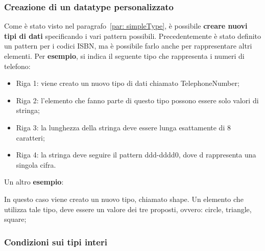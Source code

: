\documentclass[a4paper]{article}
\begin{document}
	\subsubsection{Creazione di un datatype personalizzato}
	
	Come è stato visto nel paragrafo~\ref{par: simpleType}, è possibile \textbf{creare nuovi tipi di dati} specificando i vari pattern possibili. Precedentemente è stato definito un pattern per i codici ISBN, ma è possibile farlo anche per rappresentare altri elementi. Per \textcolor{Green4}{\textbf{esempio}}, si indica il seguente tipo che rappresenta i numeri di telefono:
	
	\begin{itemize}
		\item Riga 1: viene creato un nuovo tipo di dati chiamato \textsf{TelephoneNumber};
		
		\item Riga 2: l'elemento che fanno parte di questo tipo possono essere solo valori di stringa;
		
		\item Riga 3: la lunghezza della stringa deve essere lunga esattamente di 8 caratteri;
		
		\item Riga 4: la stringa deve seguire il pattern \textsf{ddd-dddd0}, dove \textsf{d} rappresenta una singola cifra.
	\end{itemize}
	Un altro \textcolor{Green4}{\textbf{esempio}}:
	
	In questo caso viene creato un nuovo tipo, chiamato \textsf{shape}. Un elemento che utilizza tale tipo, deve essere un valore dei tre proposti, ovvero: \textsf{circle}, \textsf{triangle}, \textsf{square};\newpage
	
	\subsubsection{Condizioni sui tipi interi}
	
\end{document}
